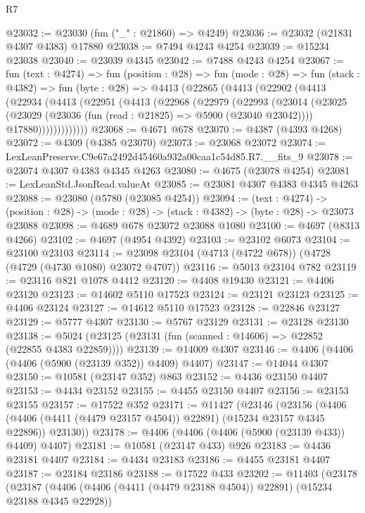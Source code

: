 \begin{lexlean}{R7}
\begin{coremodule}
@23032 := @23030 (fun ("_" : @21860) => @4249)
@23036 := @23032 (@21831 @4307 @4383) @17880
@23038 := @7494 @4243 @4254
@23039 := @15234 @23038
@23040 := @23039 @4345
@23042 := @7488 @4243 @4254
@23067 := fun (text : @4274) =>
  fun (position : @28) =>
  fun (mode : @28) =>
  fun (stack : @4382) =>
  fun (byte : @28) =>
  @4413
    (@22865
      (@4413
        (@22902
          (@4413
            (@22934
              (@4413
                (@22951
                  (@4413
                    (@22968
                      (@22979
                        (@22993
                          (@23014
                            (@23025
                              (@23029 (@23036 (fun (read : @21825) => @5900 (@23040 @23042))))
                              @17880)))))))))))))
@23068 := @4671 @678
@23070 := @4387 (@4393 @4268)
@23072 := @4309 (@4385 @23070)
@23073 := @23068 @23072
@23074 := LexLeanPreserve.C9e67a2492d45460a932a00caa1c54d85.R7.__fits_9
@23078 := @23074 @4307 @4383 @4345 @4263
@23080 := @4675 (@23078 @4254)
@23081 := LexLeanStd.JsonRead.valueAt
@23085 := @23081 @4307 @4383 @4345 @4263
@23088 := @23080 (@5780 (@23085 @4254))
@23094 := (text : @4274) ->
  (position : @28) -> (mode : @28) -> (stack : @4382) -> (byte : @28) -> @23073 @23088
@23098 := @4689 @678 @23072 @23088 @1080
@23100 := @4697 (@8313 @4266)
@23102 := @4697 (@4954 @4392)
@23103 := @23102 @6073
@23104 := @23100 @23103
@23114 := @23098 @23104 (@4713 (@4722 @678)) (@4728 (@4729 (@4730 @1080) @23072 @4707))
@23116 := @5013 @23104 @782
@23119 := @23116 @821 @1078 @4412
@23120 := @4408 @19430
@23121 := @4406 @23120
@23123 := @14602 @5110 @17523
@23124 := @23121 @23123
@23125 := @4406 @23124
@23127 := @14612 @5110 @17523
@23128 := @22846 @23127
@23129 := @5777 @4307
@23130 := @5767 @23129
@23131 := @23128 @23130
@23138 := @5024 (@23125 (@23131 (fun (scanned : @14606) => @22852 (@22855 @4383 @22859))))
@23139 := @14009 @4307
@23146 := @4406 (@4406 (@4406 (@5900 (@23139 @352)) @4409) @4407)
@23147 := @14044 @4307
@23150 := @10581 (@23147 @352) @863
@23152 := @4436 @23150 @4407
@23153 := @4434 @23152
@23155 := @4455 @23150 @4407
@23156 := @23153 @23155
@23157 := @17522 @352
@23171 := @11427
    (@23146
      (@23156
        (@4406 (@4406 (@4411 (@4479 @23157 @4504)) @22891) (@15234 @23157 @4345 @22896))
        @23130))
@23178 := @4406 (@4406 (@4406 (@5900 (@23139 @433)) @4409) @4407)
@23181 := @10581 (@23147 @433) @926
@23183 := @4436 @23181 @4407
@23184 := @4434 @23183
@23186 := @4455 @23181 @4407
@23187 := @23184 @23186
@23188 := @17522 @433
@23202 := @11403
    (@23178
      (@23187
        (@4406 (@4406 (@4411 (@4479 @23188 @4504)) @22891) (@15234 @23188 @4345 @22928))

\end{coremodule}
\end{lexlean}
